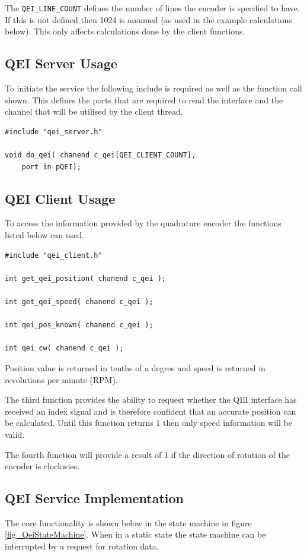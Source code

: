 The \verb=QEI_LINE_COUNT= defines the number of lines the encoder is specified to have. If this is not defined then 1024 is assumed (as used in the example calculations below). This only affects calculations done by the client functions.

\subsection{QEI Server Usage}
To initiate the service the following include is required as well as the function call shown. This defines the ports that are required to read the interface and the channel that will be utilised by the client thread.

\begin{lstlisting}
#include "qei_server.h"

void do_qei( chanend c_qei[QEI_CLIENT_COUNT],
	port in pQEI);
\end{lstlisting}

\subsection{QEI Client Usage}
To access the information provided by the quadrature encoder the functions listed below can used.

\begin{lstlisting}
#include "qei_client.h"

int get_qei_position( chanend c_qei );

int get_qei_speed( chanend c_qei );

int qei_pos_known( chanend c_qei );

int qei_cw( chanend c_qei );
\end{lstlisting}

Position value is returned in tenths of a degree and speed is returned in revolutions per minute (RPM). 

The third function provides the ability to request whether the QEI interface has received an index signal and is therefore confident that an accurate position can be calculated. Until this function returns 1 then only speed information will be valid.

The fourth function will provide a result of 1 if the direction of rotation of the encoder is clockwise.

\subsection{QEI Service Implementation}
The core functionality is shown below in the state machine in figure \ref{fig_QeiStateMachine}. When in a static state the state machine can be interrupted by a request for rotation data.

